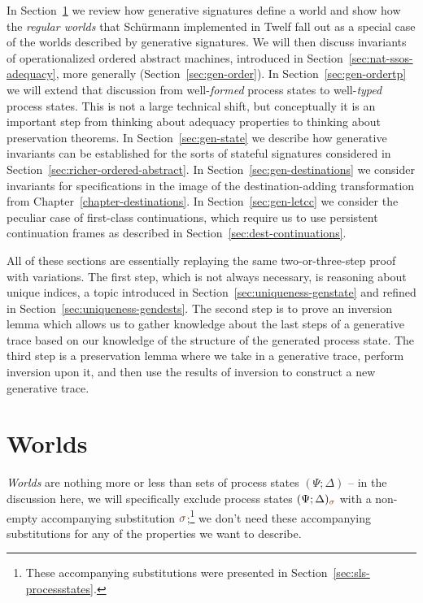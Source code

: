 In Section~\ref{sec:gen-worlds} we review how generative signatures
define a world and show how the {\it regular worlds} that Sch\"urmann
implemented in Twelf \cite{schurmann00automating} fall out as a
special case of the worlds described by generative signatures.  We
will then discuss invariants of operationalized ordered abstract
machines, introduced in Section~\ref{sec:nat-ssos-adequacy}, more
generally (Section~\ref{sec:gen-order}). In
Section~\ref{sec:gen-ordertp} we will extend that discussion from
well-{\it formed} process states to well-{\it typed} process states.
This is not a large technical shift, but conceptually it is an
important step from thinking about adequacy properties to
thinking about preservation theorems. 
In Section~\ref{sec:gen-state}
we describe how generative invariants can be established for the sorts
of stateful signatures considered in
Section~\ref{sec:richer-ordered-abstract}. In
Section~\ref{sec:gen-destinations} we consider invariants for
specifications in the image of the destination-adding transformation
from Chapter~\ref{chapter-destinations}.  In
Section~\ref{sec:gen-letcc} we consider the peculiar case of
first-class continuations, which require us to use persistent
continuation frames as described in Section~\ref{sec:dest-continuations}. 

All of these sections are essentially replaying the same
two-or-three-step proof with variations. The first step, which is not
always necessary, is reasoning about unique indices, a topic
introduced in Section~\ref{sec:uniqueness-genstate} and refined in
Section~\ref{sec:uniqueness-gendests}. The second step is to prove an
inversion lemma which allows us to gather knowledge about the last
steps of a generative trace based on our knowledge of the structure of
the generated process state. The third step is a preservation lemma
where we take in a generative trace, perform inversion upon it, and
then use the results of inversion to construct a new generative trace.

\section{Worlds}
\label{sec:gen-worlds}

{\it Worlds} are nothing more or less than sets of process states
$(\Psi; \Delta)$ -- in the discussion here, we will specifically
exclude process states $(\Psi; \Delta)_{\lf\sigma}$ with a non-empty
accompanying substitution $\lf\sigma$;\footnote{These accompanying
  substitutions were presented in
  Section~\ref{sec:sls-processstates}.} we don't need these
accompanying substitutions for any of the properties we want to
describe. 

